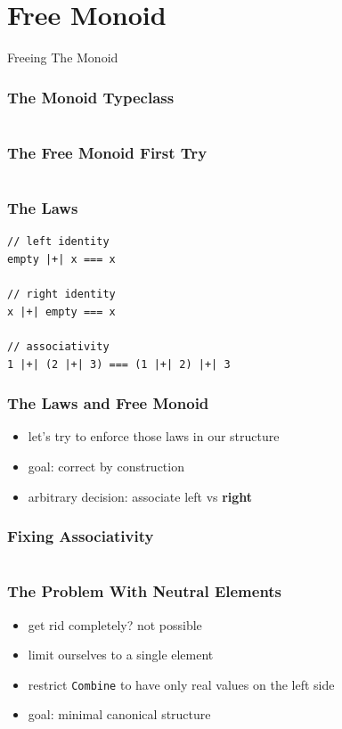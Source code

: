\documentclass{beamer}
\begin{document}
\section{Free Monoid}
\label{sec:free-monoid}

\begin{frame}
  \begin{center}
    \Huge
    Freeing The Monoid
  \end{center}
\end{frame}

\begin{frame}
  \frametitle{The Monoid Typeclass}
  \inputminted{scala}{snippets/monoid-typeclass.scala}
\end{frame}

\begin{frame}
  \frametitle{The Free Monoid \textemdash{} First Try}
  \inputminted{scala}{snippets/free-monoid-1.scala}
\end{frame}

\begin{frame}[fragile]
  \frametitle{The Laws}
  \begin{verbatim}
// left identity
empty |+| x === x

// right identity
x |+| empty === x

// associativity
1 |+| (2 |+| 3) === (1 |+| 2) |+| 3
  \end{verbatim}
\end{frame}

\begin{frame}
  \frametitle{The Laws and Free Monoid}
  \begin{itemize}
  \item let's try to enforce those laws in our structure
  \item goal: correct by construction
  \item arbitrary decision: associate left vs \textbf{right}
  \end{itemize}
\end{frame}

\begin{frame}
  \frametitle{Fixing Associativity}
  \inputminted[highlightlines={11,13,7}, highlightcolor=yellow!40]{scala}{snippets/free-monoid-2.scala}
\end{frame}

\begin{frame}
  \frametitle{The Problem With Neutral Elements}
  \begin{itemize}
  \item get rid completely? not possible
  \item limit ourselves to a single element
  \item restrict \texttt{Combine} to have only real values on the left side
  \item goal: minimal canonical structure
  \end{itemize}
\end{frame}
\end{document}
